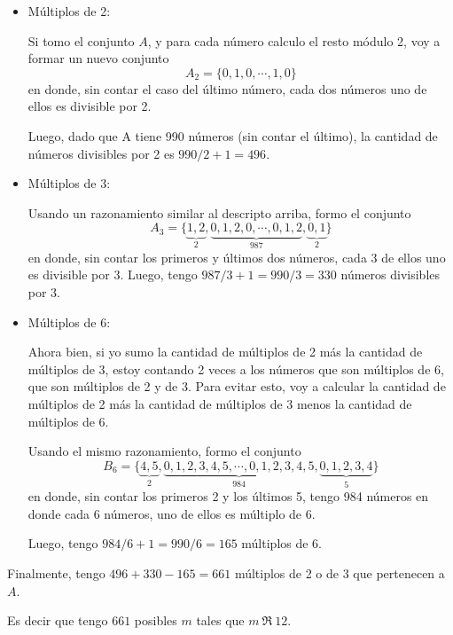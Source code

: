 \documentclass[a4paper,spanish]{article}
\begin{document}
    \begin{itemize}

      \item Múltiplos de 2:

      Si tomo el conjunto $A$, y para cada número calculo el resto módulo 2, voy 
      a formar un nuevo conjunto
      \[
        A_2 = \{0, 1, 0, \cdots, 1, 0\}
      \]
      en donde, sin contar el caso del último número, cada dos números 
      uno de ellos es divisible por 2. 

      Luego, dado que A tiene 990 números (sin contar el último),
      la cantidad de números divisibles por 2 es $990/2 + 1 = 496$.

      \item Múltiplos de 3:

      Usando un razonamiento similar al descripto arriba, formo el conjunto
      \[
        A_3 = \{\underbrace{1, 2}_{2}, \underbrace{0, 1, 2, 0, 
        \cdots, 0, 1, 2}_{987}, \underbrace{0, 1}_{2}\}
      \]
      en donde, sin contar los primeros y últimos dos números, cada 3 de ellos
      uno es divisible por 3. Luego, tengo $987/3 + 1 = 990/3 = 330$ números
      divisibles por 3.

      \item Múltiplos de 6:

      Ahora bien, si yo sumo la cantidad de múltiplos de 2 más la cantidad de
      múltiplos de 3, estoy contando 2 veces a los números que son múltiplos de 6,
      que son múltiplos de 2 y de 3. Para evitar esto, voy a calcular la cantidad
      de múltiplos de 2 más la cantidad de múltiplos de 3 menos la cantidad de
      múltiplos de 6.

      Usando el mismo razonamiento, formo el conjunto
      \[
        B_6 = \{\underbrace{4, 5}_{2}, \underbrace{0, 1, 2, 3, 4, 5, 
        \cdots, 0, 1, 2, 3, 4, 5}_{984}, \underbrace{0, 1, 2, 3, 4}_{5} \}
      \]
      en donde, sin contar los primeros 2 y los últimos 5, tengo 984 números
      en donde cada 6 números, uno de ellos es múltiplo de 6.

      Luego, tengo $984/6 + 1 = 990/6 = 165$ múltiplos de 6.

    \end{itemize}

    Finalmente, tengo $496 + 330 - 165 = 661$ múltiplos de 2 o de 3 que 
    pertenecen a $A$. 

    Es decir que tengo $661$ posibles $m$ tales que
    $m\>\mathfrak{R}\>12$.
\end{document}

